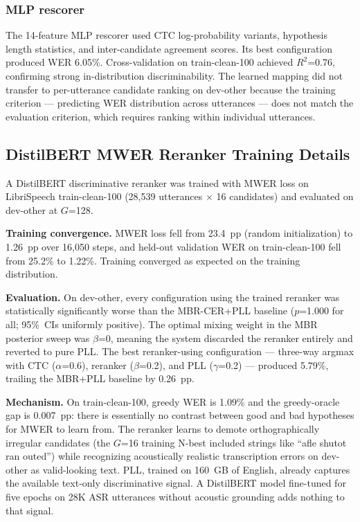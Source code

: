 \subsubsection{MLP rescorer}

The 14-feature MLP rescorer used CTC log-probability variants, hypothesis length
statistics, and inter-candidate agreement scores. Its best configuration
produced WER 6.05\%. Cross-validation on train-clean-100 achieved $R^2$=0.76, confirming strong
in-distribution discriminability. The learned mapping did not transfer to per-utterance candidate
ranking on dev-other because the training criterion — predicting WER distribution across utterances —
does not match the evaluation criterion, which requires ranking within individual utterances.



\subsection{DistilBERT MWER Reranker Training Details}

A DistilBERT discriminative reranker \cite{sanh2019distilbert} was trained with MWER loss on LibriSpeech train-clean-100 (28,539 utterances $\times$ 16 candidates) and evaluated on dev-other at $G$=128.

\textbf{Training convergence.} MWER loss fell from 23.4~pp (random initialization) to 1.26~pp
over 16,050 steps, and held-out validation WER on train-clean-100 fell from 25.2\% to 1.22\%.
Training converged as expected on the training distribution.

\textbf{Evaluation.} On dev-other, every configuration using the trained reranker was statistically significantly
worse than the MBR-CER+PLL baseline ($p$=1.000 for all; 95\%\ CIs uniformly positive). The
optimal mixing weight in the MBR posterior sweep was $\beta$=0, meaning the system discarded the
reranker entirely and reverted to pure PLL. The best reranker-using configuration — three-way
argmax with CTC ($\alpha$=0.6), reranker ($\beta$=0.2), and PLL ($\gamma$=0.2) — produced 5.79\%,
trailing the MBR+PLL baseline by 0.26~pp.

\textbf{Mechanism.} On train-clean-100, greedy WER is 1.09\% and the greedy-oracle gap is 0.007~pp: there is
essentially no contrast between good and bad hypotheses for MWER to learn from. The reranker
learns to demote orthographically irregular candidates (the $G$=16 training N-best included
strings like ``afle shutot ran outed'') while recognizing acoustically realistic transcription
errors on dev-other as valid-looking text. PLL, trained on 160~GB of English, already captures
the available text-only discriminative signal. A DistilBERT model fine-tuned for five epochs on
28K ASR utterances without acoustic grounding adds nothing to that signal.
